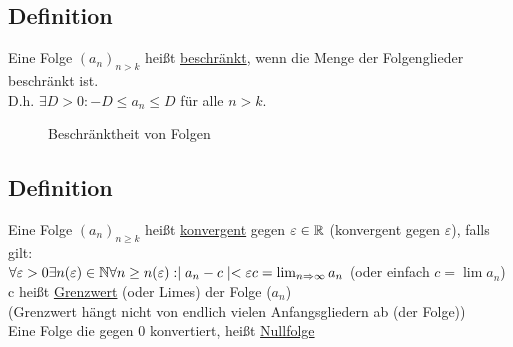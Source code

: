 \subsection{Definition}
Eine Folge $(a_n)_{n>k}$ hei\ss t \underline{beschr\"ankt}, wenn die Menge der Folgenglieder beschr\"ankt ist. \\
D.h. $\exists D > 0 : - D \leq a_n \leq D$ f\"ur alle $n > k$.\\

\begin{figure}[h!]
\centering \caption{Beschränktheit von Folgen}
\end{figure}
\subsection{Definition}
Eine Folge $(a_n)_{n \geq k}$ hei\ss t \uline{konvergent} gegen $\varepsilon \in \mathbb{R}$ (konvergent gegen $\varepsilon$), falls gilt:\\
$\forall \varepsilon > 0 \exists n(\varepsilon) \in \mathbb{N} \forall n \geq n(\varepsilon) : \mid a_n -c \mid < \varepsilon\\
c = \lim_{n \Rightarrow \infty} a_n $ (oder einfach $c = \lim a_n$)\\
c hei\ss t \uline{Grenzwert} (oder Limes) der Folge ($a_n$)\\
(Grenzwert h\"angt nicht von endlich vielen Anfangsgliedern ab (der Folge))\\
Eine Folge die gegen 0 konvertiert, hei\ss t \uline{Nullfolge}\\
